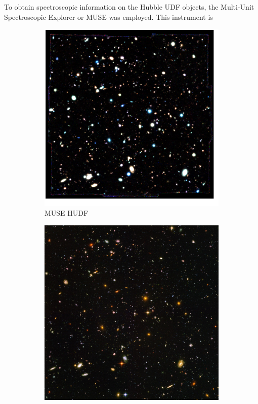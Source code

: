 \documentclass[12pt, onecolumn]{revtex4}    %
\begin{document}
To obtain spectroscopic information on the Hubble UDF objects, the Multi-Unit Spectroscopic Explorer or MUSE was employed. This instrument is 



\begin{figure}
  \begin{subfigure}[b]{0.4\textwidth}
    \includegraphics[width=\textwidth]{introduction/muse_colour_image}
    \captionsetup{justification=justified}    
    \caption{MUSE HUDF}               
    \label{fig:muse_colour_image}
  \end{subfigure}
  \begin{subfigure}[b]{0.4\textwidth}
    \includegraphics[width=\textwidth]{introduction/hubble_ultra_deep_field}

\end{subfigure}
\end{figure}
\end{document}
